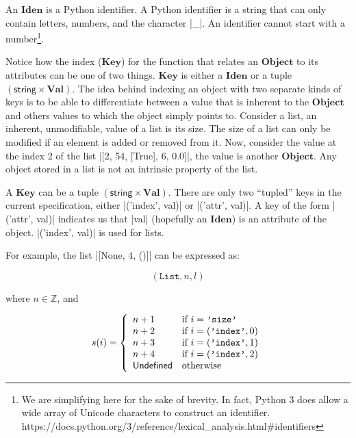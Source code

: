 An \(\mathbf{Iden}\) is a Python identifier. A Python identifier is a string that can only
contain letters, numbers, and the character \pycode|_|.  An identifier cannot start with a
number\footnote{We are simplifying here for the sake of brevity. In fact, Python 3 does
  allow a wide array of Unicode characters to construct an identifier.
  https://docs.python.org/3/reference/lexical\_analysis.html\#identifiers}.

Notice how the index (\(\mathbf{Key}\)) for the function that relates an
\(\mathbf{Object}\) to its attributes can be one of two things. \(\mathbf{Key}\) is either
a \(\mathbf{Iden}\) or a tuple \(\left(\textsf{string} \times \mathbf{Val}\right)\). The
idea behind indexing an object with two separate kinds of keys is to be able to
differentiate between a value that is inherent to the \(\mathbf{Object}\) and others
values to which the object simply points to. Consider a list, an inherent, unmodifiable,
value of a list is its size. The size of a list can only be modified if an element is
added or removed from it.  Now, consider the value at the index 2 of the list
\pycode|[2, 54, [True], 6, 0.0]|, the value is another \(\mathbf{Object}\). Any object
stored in a list is not an intrinsic property of the list.

A \(\mathbf{Key}\) can be a tuple \(\left(\textsf{string} \times \mathbf{Val}\right)\).
There are only two \enquote{tupled} keys in the current specification, either
\pycode|('index', val)| or \pycode|('attr', val)|. A key of the form
\pycode|('attr', val)| indicates us that \pycode|val| (hopefully an \(\mathbf{Iden}\)) is
an attribute of the object. \pycode|('index', val)| is used for lists.

For example, the list \pycode|[None, 4, ()]| can be expressed as:

  \[\left(\texttt{List}, n, l\right)\]

  where \(n \in \mathbb{Z}\), and

  \[s(i) = \left\{
    \begin{array}{ll}
      n + 1 & \text{if } i = \texttt{'size'} \\
      n + 2 & \text{if } i = (\texttt{'index'}, 0) \\
      n + 3 & \text{if } i = (\texttt{'index'}, 1) \\
      n + 4 & \text{if } i = (\texttt{'index'}, 2) \\
      \mathsf{Undefined}        & \text{otherwise} \\
    \end{array}
  \right.\]


